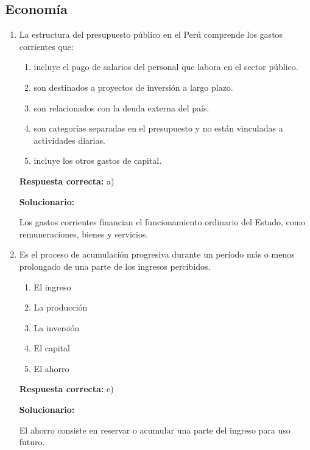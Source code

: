 \subsection*{Economía}

\begin{enumerate}[resume]
	
	\item La estructura del presupuesto público en el Perú comprende los gastos corrientes que:
	\begin{enumerate}[label=\alph*)]
		\item incluye el pago de salarios del personal que labora en el sector público.
		\item son destinados a proyectos de inversión a largo plazo.
		\item son relacionados con la deuda externa del país.
		\item son categorías separadas en el presupuesto y no están vinculadas a actividades diarias.
		\item incluye los otros gastos de capital.
	\end{enumerate}
	\textbf{Respuesta correcta:} a)
	
	\vspace{2mm}
	\textbf{Solucionario:}
	
	Los gastos corrientes financian el funcionamiento ordinario del Estado, como remuneraciones, bienes y servicios.
	
	\vspace{6mm}
	
	\item Es el proceso de acumulación progresiva durante un período más o menos prolongado de una parte de los ingresos percibidos.
	\begin{enumerate}[label=\alph*)]
		\item El ingreso
		\item La producción
		\item La inversión
		\item El capital
		\item El ahorro
	\end{enumerate}
	\textbf{Respuesta correcta:} e)
	
	\vspace{2mm}
	\textbf{Solucionario:}
	
	El ahorro consiste en reservar o acumular una parte del ingreso para uso futuro.
	
	\vspace{6mm}
	
\end{enumerate}

